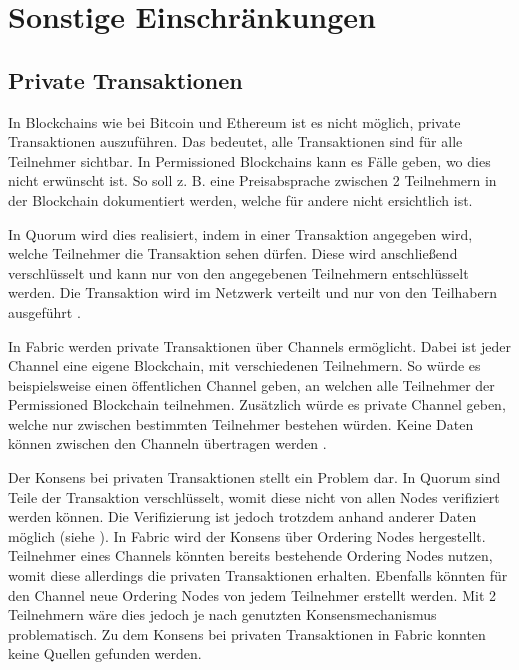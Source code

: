 \section{Sonstige Einschränkungen}

\subsection{Private Transaktionen}
In Blockchains wie bei Bitcoin und Ethereum ist es nicht möglich, private Transaktionen auszuführen. Das bedeutet, alle Transaktionen sind für alle Teilnehmer sichtbar. In Permissioned Blockchains kann es Fälle geben, wo dies nicht erwünscht ist. So soll z. B. eine Preisabsprache zwischen 2 Teilnehmern in der Blockchain dokumentiert werden, welche für andere nicht ersichtlich ist.

In Quorum wird dies realisiert, indem in einer Transaktion angegeben wird, welche Teilnehmer die Transaktion sehen dürfen. Diese wird anschließend verschlüsselt und kann nur von den angegebenen Teilnehmern entschlüsselt werden. Die Transaktion wird im Netzwerk verteilt und nur von den Teilhabern ausgeführt \cite{QuorumTeamTransactionProcessingQuorum2018}.

In Fabric werden private Transaktionen über Channels ermöglicht. Dabei ist jeder Channel eine eigene Blockchain, mit verschiedenen Teilnehmern. So würde es beispielsweise einen öffentlichen Channel geben, an welchen alle Teilnehmer der Permissioned Blockchain teilnehmen. Zusätzlich würde es private Channel geben, welche nur zwischen bestimmten Teilnehmer bestehen würden. Keine Daten können zwischen den Channeln übertragen werden \cite{SchererPerformanceScalabilityBlockchain2017}. 

Der Konsens bei privaten Transaktionen stellt ein Problem dar. In Quorum sind Teile der Transaktion verschlüsselt, womit diese nicht von allen Nodes verifiziert werden können. Die Verifizierung ist jedoch trotzdem anhand anderer Daten möglich (siehe \cite{QuorumTeamQuorumChainConsensus2018}). In Fabric wird der Konsens über Ordering Nodes hergestellt. Teilnehmer eines Channels könnten bereits bestehende Ordering Nodes nutzen, womit diese allerdings die privaten Transaktionen erhalten. Ebenfalls könnten für den Channel neue Ordering Nodes von jedem Teilnehmer erstellt werden. Mit 2 Teilnehmern wäre dies jedoch je nach genutzten Konsensmechanismus problematisch. Zu dem Konsens bei privaten Transaktionen in Fabric konnten keine Quellen gefunden werden.

